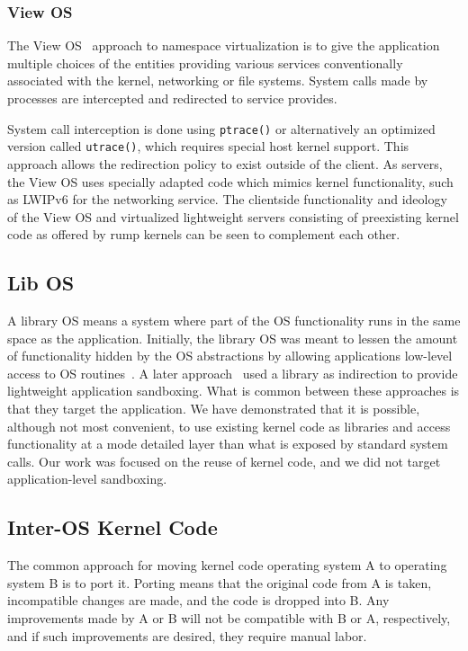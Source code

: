 \subsubsection*{View OS}

The View OS~\cite{gardenghi:viewos} approach to namespace virtualization
is to give the application multiple choices of the entities providing
various services conventionally associated with the kernel, \eg networking
or file systems.  System calls made by processes are intercepted and
redirected to service provides.

System call interception is done using \texttt{ptrace()} or alternatively
an optimized version called \texttt{utrace()}, which requires special
host kernel support.  This approach allows the redirection policy to
exist outside of the client.  As servers, the View OS uses specially
adapted code which mimics kernel functionality, such as LWIPv6 for the
networking service.  The clientside functionality and ideology of the View
OS and virtualized lightweight servers consisting of preexisting kernel
code as offered by rump kernels can be seen to complement each other.

\subsection{Lib OS}

A library OS means a system where part of the OS functionality runs in
the same space as the application.  Initially, the library OS was meant
to lessen the amount of functionality hidden by the OS abstractions by
allowing applications low-level access to OS routines~\cite{engler:exo,
kaashoek:exoapp}.  A later approach~\cite{porter:drawbridge} used a
library as indirection to provide lightweight application sandboxing.
What is common between these approaches is that they target the
application.  We have demonstrated that it is possible, although not
most convenient, to use existing kernel code as libraries and access
functionality at a mode detailed layer than what is exposed by standard
system calls.  Our work was focused on the reuse of kernel code, and
we did not target application-level sandboxing.

\subsection{Inter-OS Kernel Code}

The common approach for moving kernel code operating system A to
operating system B is to port it.  Porting means that the original
code from A is taken, incompatible changes are made, and the code
is dropped into B.  Any improvements made by A or B will not be
compatible with B or A, respectively, and if such improvements are
desired, they require manual labor.

